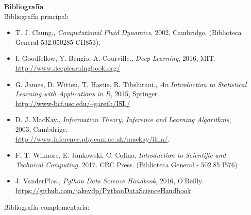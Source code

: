 \documentclass[letterpaper,10pt,onecolumn]{article}
\begin{document}
\newpage
{}
\noindent\textbf{\large {} \quad
  Bibliograf\'ia}\\[-0.2cm] 


\noindent\normalsize Bibliograf\'ia principal:

\begin{itemize}
\item T. J. Chung., \textit{Computational Fluid Dynamics}, 2002,
  Cambridge. (Biblioteca General 532.050285 CH853).
  \\[-0.6cm] 
\item I. Goodfellow, Y. Bengio, A. Courville., \textit{Deep Learning}, 
  2016, MIT.\\
  \url{http://www.deeplearningbook.org/}
  \\[-0.6cm] 
\item G. James, D. Witten, T. Hastie, R. Tibshirani., \textit{An
  Introduction to Statistical Learning with Applications in R}, 2015,
  Springer. \\
  \url{http://www-bcf.usc.edu/~gareth/ISL/} \\[-0.6cm] 
\item D. J. MacKay., \textit{Information Theory, Inference and
  Learning Algorithms}, 2003,
  Cambdrige. \\
  \url{http://www.inference.phy.cam.ac.uk/mackay/itila/}.
  \\[-0.6cm]  
\item F. T. Wilmore, E. Jankowski, C. Colina, \textit{Introduction
  to Scientific and Technical Computing}, 2017. CRC Press. (Biblioteca
  General - 502.85 I576)\\[-0.6cm] 
\item J. VanderPlas., \textit{Python Data Science Handbook}, 2016,
  O'Reilly.\\
  \url{https://github.com/jakevdp/PythonDataScienceHandbook} 
  \\[-0.2cm] 

\end{itemize} 

\noindent\normalsize Bibliograf\'ia complementaria:
\end{document}
